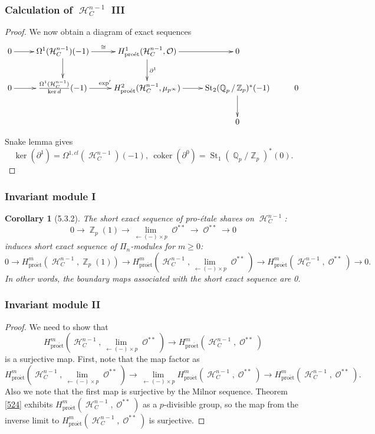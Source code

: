 \documentclass{beamer}
\newtheorem{cor}[thm]{Corollary}
\theoremstyle{definition}
\newcommand{\coker}{\operatorname{coker}}
\newcommand{\pet}{\operatorname{pro\acute{e}t}}
\newcommand{\St}{\operatorname{St}}
\newcommand{\OO}{\operatorname{\mathcal{O}}}
\newcommand{\ZZ}{\operatorname{\mathbb{Z}}}
\newcommand{\QQ}{\operatorname{\mathbb{Q}}}
\newcommand{\HH}{\operatorname{\mathcal{H}}}
\begin{document}
\begin{frame}
\frametitle{Calculation of $\HH_C^{n - 1}$ III}
\begin{proof}
We now obtain a diagram of exact sequences
\[ \xymatrix{ 0 \ar[r] & \Omega^1(\HH_C^{n - 1})(-1) \ar[r]^-{\cong} \ar[d] & H^1_{\pet}(\HH_C^{n - 1}, \OO) \ar[r] \ar[d]^{\partial^1} & 0 \\ 0 \ar[r] & \frac{\Omega^{1}(\HH_C^{n - 1})}{\ker d}(-1) \ar[r]^{\exp '} & H^2_{\pet}(\HH_C^{n - 1}, \mu_{p^\infty}) \ar[r] & \St_2(\QQ_p/\ZZ_p)^*(-1) \ar[d] & 0 \\ & & & 0 }  \]

Snake lemma gives $$\ker(\partial^1) = \Omega^{1, cl}(\HH_C^{n - 1})(-1), \ \coker(\partial^0) = \St_1(\QQ_p/\ZZ_p)^*(0).$$ 
	
\end{proof}
\end{frame}

\begin{frame}
\frametitle{Invariant module I}
\begin{cor}[5.3.2]
	The short exact sequence of pro-\'etale shaves on $\HH_C^{n - 1}$: $$0 \to \ZZ_p(1) \to \lim_{\leftarrow(-)\times p}\OO^{**} \to \OO^{**} \to 0$$ induces short exact sequence of $\Pi_n$-modules for $m \geq 0$:
	$$0 \to H^m_{\pet}(\HH_C^{n - 1}, \ZZ_p(1)) \to H^m_{\pet}(\HH_C^{n - 1}, \lim_{\leftarrow(-)\times p}\OO^{**}) \to H^m_{\pet}(\HH_C^{n - 1}, \OO^{**})\to 0.$$ In other words, the boundary maps associated with the short exact sequence are 0.
\end{cor}
\end{frame}

\begin{frame}%
\frametitle{Invariant module II}
\begin{proof}
	We need to show that $$H^m_{\pet}({\HH_C^{n -1}}, \lim_{\leftarrow(-)\times p}\OO^{**}) \to H^m_{\pet}({\HH_C^{n -1}}, \OO^{**})$$ is a surjective map. First, note that the map factor as $$H^m_{\pet}({\HH_C^{n -1}}, \lim_{\leftarrow(-)\times p}\OO^{**}) \to \lim_{\leftarrow(-)\times p}H^m_{\pet}({\HH_C^{n -1}}, \OO^{**}) \to H^m_{\pet}({\HH_C^{n -1}}, \OO^{**}).$$ Also we note that the first map is surjective by the Milnor sequence. Theorem \ref{524} exhibits $H^m_{\pet}({\HH_C^{n -1}}, \OO^{**})$ as a $p$-divisible group, so the map from the inverse limit to $H^m_{\pet}({\HH_C^{n -1}}, \OO^{**})$ is surjective.
\end{proof}
\end{frame}
\end{document}
